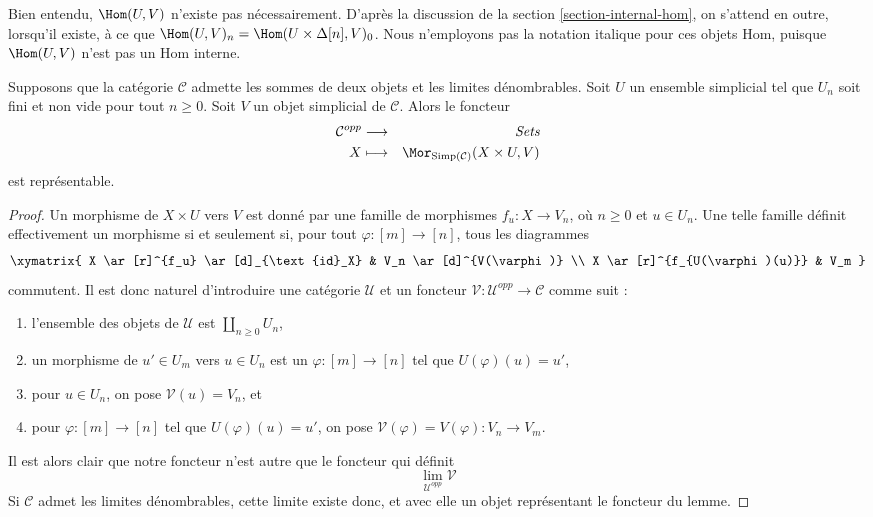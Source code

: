 \noindent
Bien entendu, $\Hom(U, V)$ n'existe pas nécessairement. D'après la
discussion de la section \ref{section-internal-hom}, on s'attend en outre,
lorsqu'il existe, à ce que
$\Hom(U, V)_n = \Hom(U \times \Delta[n], V)_0$.
Nous n'employons pas la notation italique pour ces objets Hom, puisque
$\Hom(U, V)$ n'est pas un Hom interne.

\begin{lemma}
\label{lemma-exists-hom-0-from-simplicial-set}
Supposons que la catégorie $\mathcal{C}$ admette les sommes de deux objets
et les limites dénombrables. Soit $U$ un ensemble simplicial tel que $U_n$
soit fini et non vide pour tout $n \geq 0$. Soit $V$ un objet simplicial
de $\mathcal{C}$. Alors le foncteur
\begin{eqnarray*}
\mathcal{C}^{opp} & \longrightarrow & \textit{Sets} \\
X
& \longmapsto &
\Mor_{\text{Simp}(\mathcal{C})}(X \times U, V)
\end{eqnarray*}
est représentable.
\end{lemma}

\begin{proof}
Un morphisme de $X \times U$ vers $V$ est donné par une famille de
morphismes $f_u : X \to V_n$, où $n \geq 0$ et $u \in U_n$.
Une telle famille définit effectivement un morphisme si et seulement si,
pour tout $\varphi : [m] \to [n]$, tous les diagrammes
$$
\xymatrix{
X \ar[r]^{f_u} \ar[d]_{\text{id}_X} & V_n \ar[d]^{V(\varphi)} \\
X \ar[r]^{f_{U(\varphi)(u)}} & V_m
}
$$
commutent. Il est donc naturel d'introduire une catégorie $\mathcal{U}$
et un foncteur
$\mathcal{V} : \mathcal{U}^{opp} \to \mathcal{C}$
comme suit :
\begin{enumerate}
\item l'ensemble des objets de $\mathcal{U}$ est
$\coprod_{n \geq 0} U_n$,
\item un morphisme de $u' \in U_m$ vers $u \in U_n$ est un
$\varphi : [m] \to [n]$ tel que $U(\varphi)(u) = u'$,
\item pour $u \in U_n$, on pose $\mathcal{V}(u) = V_n$, et
\item pour $\varphi : [m] \to [n]$ tel que $U(\varphi)(u) = u'$,
on pose $\mathcal{V}(\varphi) = V(\varphi) : V_n \to V_m$.
\end{enumerate}
Il est alors clair que notre foncteur n'est autre que le foncteur qui
définit
$$
\lim_{\mathcal{U}^{opp}} \mathcal{V}
$$
Si $\mathcal{C}$ admet les limites dénombrables, cette limite existe donc,
et avec elle un objet représentant le foncteur du lemme.
\end{proof}

